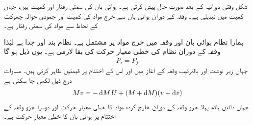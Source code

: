 شکل   وقتی دورانیہ  کے بعد صورت حال پیش کرتی ہے۔ ہوائی بان کی سمتی رفتار  اور کمیت  ہیں، جہاں کمیت میں تبدیلی  ہے۔ وقفہ  کے دوران ہوائی بان سے  خرج  مواد کی کمیت   اور جمودی  حوالہ چھوکٹ کے لحاظ  سے    مواد کی سمتی  رفتار  ہے۔

ہمارا  نظام  ہوائی بان اور وقفہ  میں  خرج  مواد پر مشتمل ہے۔ نظام بند اور  جدا ہے لہٰذا وقفہ  کے دوران نظام کی خطی معیار حرکت کی بقا لازمی ہے۔ یوں ذیل ہو گا
\begin{align}\label{مساوات_مرکز_کمیت_معیار_بقا_لازمی}
P_i=P_f
\end{align}
جہاں زیر نوشت   اور  بالترتیب  وقفہ   کے آغاز میں اور  اس کے اختتام پر قیمتیں ظاہر کرتی ہیں۔ مساوات  درج ذیل لکھی جا سکتی ہے
\begin{align}\label{مساوات_مرکز_کمیت_وقفہ_کے_دوران}
Mv=-\dif M \,U+(M+\dif M)(v+\dif v)
\end{align}
جہاں دائیں ہاتھ پہلا جزو وقفہ   کے دوران خارج کردہ مواد کا  خطی معیار حرکت اور  دوسرا جزو وقفہ   کے اختتام  پر ہوائی بان کا خطی معیار حرکت  ہے۔

